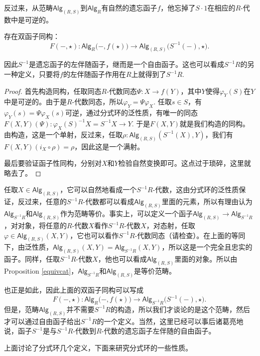反过来，从范畴$\mathsf{Alg}_{(R,S)}$到$\mathsf{Alg}_R$有自然的遗忘函子$f$，他忘掉了$S\cdot 1$在相应的$R$-代数中是可逆的。

\begin{thm}
存在双函子同构：
\[
	F(-,\star):\mathsf{Alg}_R\bigl(-,f(\star)\bigr)\to \mathsf{Alg}_{(R,S)}\bigl(S^{-1}(-),\star\bigr).
\]
\end{thm}

因此$S^{-1}$是遗忘函子的左伴随函子，继而是一个自由函子。这也可以看成$S^{-1}R$的另一种定义，只要将$f$的左伴随函子作用在$R$上就得到了$S^{-1}R$.

\begin{proof}
	首先构造同构，任取同态$R$-代数同态$\Psi:X\to f(Y)$，其中$Y$使得$\varphi_Y(S)$在$Y$中是可逆的。由于是$R$-代数同态，所以$\varphi_Y=\Psi\varphi_X$. 任取$s\in S$，有$\varphi_Y(s)=\Psi\varphi_X(s)$可逆，通过分式环的泛性质，有唯一的同态$F(X,Y)(\Psi):\varphi_X(S)^{-1}X=S^{-1}X\to Y$. 于是$F(X,Y)$就是我们构造的同构。由构造，这是一个单射，反过来，任取$\rho:\mathsf{Alg}_{(R,S)}(S^{-1}(X),Y)$，我们有$F(X,Y)(i_X\circ \rho)=\rho$，因此这是一个满射。

	最后要验证函子性同构，分别对$X$和$Y$检验自然变换即可。这点过于琐碎，这里就略去了。
\end{proof}

任取$X\in \mathsf{Alg}_{(R,S)}$，它可以自然地看成一个$S^{-1}R$-代数，这由分式环的泛性质保证，反过来，任意的$S^{-1}R$-代数都可以看成$\mathsf{Alg}_{(R,S)}$里面的元素，所以有理由认为$\mathsf{Alg}_{S^{-1}R}$和$\mathsf{Alg}_{(R,S)}$作为范畴等价。事实上，可以定义一个函子$\mathsf{Alg}_{(R,S)}\to \mathsf{Alg}_{S^{-1}R}$，对对象，将任意的$R$-代数$X$看作$S^{-1}R$-代数$X$，对态射，任取$\varphi\in \mathsf{Alg}_{(R,S)}(X,Y)$，它也可以看作$S^{-1}R$-代数同态（请检查）。在上面的等同下，由泛性质，$\mathsf{Alg}_{(R,S)}(X,Y)=\mathsf{Alg}_{S^{-1}R}(X,Y)$，所以这是一个完全且忠实的函子。同样，任取$S^{-1}R$-代数$X$，他也可以看成$\mathsf{Alg}_{(R,S)}$里面的对象。所以由Proposition \ref{equivcat}，$\mathsf{Alg}_{S^{-1}R}$和$\mathsf{Alg}_{(R,S)}$是等价范畴。

也正是如此，因此上面的双函子同构可以写成
\[
	F(-,\star):\mathsf{Alg}_R\bigl(-,f(\star)\bigr)\to \mathsf{Alg}_{S^{-1}R}\bigl(S^{-1}(-),\star\bigr).
\]
但是，范畴$\mathsf{Alg}_{(R,S)}$并不需要$S^{-1}R$的构造，所以我们才谈论的是这个范畴，然后才可以通过自由函子给出$S^{-1}R$的一个定义。当然，这里已经可以事后诸葛亮地说，函子$S^{-1}$是与$S^{-1}R$-代数到$R$-代数的遗忘函子左伴随的自由函子。\endpara

上面讨论了分式环几个定义，下面来研究分式环的一些性质。

